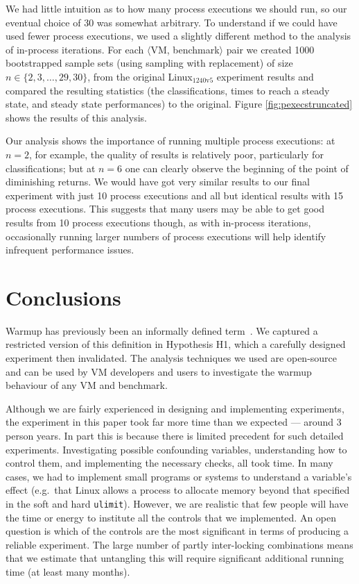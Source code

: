 \documentclass[acmsmall,screen]{acmart}
\newcommand{\bencherseven}{Linux$_\mathrm{1240v5}$\xspace}
\newcommand{\vmbpair}{$\langle$VM, benchmark$\rangle$\xspace}
\newcommand{\numpexecs}{30\xspace}
\begin{document}
We had little intuition as to how many process executions we should run, so our
eventual choice of \numpexecs was somewhat arbitrary. To understand if we could
have used fewer process executions, we used a slightly different method
to the analysis of in-process iterations. For each \vmbpair pair we created
1000 bootstrapped sample sets (using sampling with replacement) of size
$n \in \{2, 3, \ldots, 29, 30\}$, from the original \bencherseven experiment results
and compared the resulting statistics
(the classifications, times to reach a steady state, and steady state performances) to
the original. Figure \ref{fig:pexecstruncated} shows the results of this analysis.

Our analysis shows the importance of running multiple
process executions: at $n=2$, for example, the quality of results is relatively
poor, particularly for classifications; but at $n=6$ one can clearly observe the beginning of the point of
diminishing returns. We would have got very similar results to our final
experiment with just 10 process executions and all but identical results with 15 process
executions. This suggests that many users may be able to get
good results from 10 process executions though, as with in-process
iterations, occasionally running larger numbers of process executions will help
identify infrequent performance issues.


\section{Conclusions}
\label{sec:conclusions}

Warmup has previously been an informally defined term~\cite{seaton15phd}. We
captured a restricted version of this definition in Hypothesis H1, which
a carefully designed experiment then invalidated. The analysis
techniques we used are open-source and can be used by VM developers and users to investigate the
warmup behaviour of any VM and benchmark.

Although we are fairly experienced in designing and implementing
experiments, the experiment in this paper took far more time than we expected
--- around 3 person years. In part this is because there is limited precedent for such detailed
experiments. Investigating possible confounding variables, understanding how to
control them, and implementing the necessary checks, all took time. In many
cases, we had to implement small programs or systems to understand a variable's
effect (e.g.~that Linux allows a process to allocate memory beyond that
specified in the soft and hard \texttt{ulimit}). However, we are realistic that
few people will have the time or energy to institute all the controls that we
implemented. An open question is which of the controls are the most significant
in terms of producing a reliable experiment. The large number of partly
inter-locking combinations means that we estimate that untangling this will
require significant additional running time (at least many months).
\end{document}
